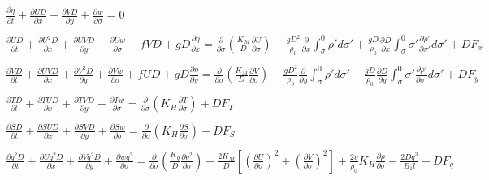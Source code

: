 \documentclass[oribibl]{llncs}
\begin{document}
\begin{eqnarray}
&&\frac{\partial \eta}{\partial t} + \frac{\partial UD}{\partial x}+ \frac{\partial VD}{\partial y}+ \frac{\partial w}{\partial \sigma}=0  \label{eq:final1}\\ 
\nonumber \\ 
&&\frac{\partial UD}{\partial t}  +\frac{\partial U^2D}{\partial x} +\frac{\partial UVD}{\partial y}+ \frac{\partial Uw}{\partial \sigma}-fVD+gD\frac{\partial \eta}{\partial x} = \frac{\partial}{\partial \sigma}\left( \frac{K_M}{D}\frac{\partial U}{\partial \sigma} \right) - \frac{gD^2}{\rho_0} \frac{\partial}{\partial x} \int_\sigma^0 \rho' d \sigma' + \frac{gD}{\rho_0}\frac{\partial D}{\partial x} \int_\sigma^0 \sigma' \frac{\partial \rho'}{\partial \sigma'} d \sigma' + DF_x  \label{eq:final2}\nonumber \\  
\\ 
&&\frac{\partial VD}{\partial t}  +\frac{\partial UVD}{\partial x} +\frac{\partial V^2D}{\partial y} + \frac{\partial Vw}{\partial \sigma} +fUD+gD\frac{\partial \eta}{\partial y} = \frac{\partial}{\partial \sigma}\left( \frac{K_M}{D}\frac{\partial V}{\partial \sigma} \right) - \frac{gD^2}{\rho_0} \frac{\partial}{\partial y} \int_\sigma^0 \rho' d \sigma' + \frac{gD}{\rho_0}\frac{\partial D}{\partial y} \int_\sigma^0 \sigma' \frac{\partial \rho'}{\partial \sigma'} d \sigma' + DF_y  \label{eq:final3}\nonumber \\  
\\  
&&\frac{\partial TD}{\partial t}+\frac{\partial TUD}{\partial x}+\frac{\partial TVD}{\partial y}+\frac{\partial Tw}{\partial \sigma} = \frac{\partial}{\partial \sigma}  \left ( K_H \frac{\partial T}{\partial \sigma} \right) +D F_T  \label{eq:final4}\\ 
\nonumber \\ 
&&\frac{\partial SD}{\partial t}+\frac{\partial SUD}{\partial x}+\frac{\partial SVD}{\partial y}+\frac{\partial Sw}{\partial \sigma} = \frac{\partial}{\partial \sigma}  \left ( K_H \frac{\partial S}{\partial \sigma} \right) +D F_S \label{eq:final5} \\ 
\nonumber \\ 
&&\frac{\partial q^2D}{\partial t} + \frac{\partial Uq^2D}{\partial x} +\frac{\partial Vq^2D}{\partial y} + \frac{\partial wq^2}{\partial \sigma}  = \frac{\partial}{\partial \sigma} \left( \frac{K_q}{D}  \frac{\partial q^2}{\partial \sigma} \right)+\frac{2K_M}{D}\left[ \left( \frac{\partial U}{\partial \sigma}\right)^2 + \left( \frac{\partial V}{\partial \sigma}\right)^2 \right] + \frac{2g}{\rho_0}K_H\frac{\partial \rho}{\partial \sigma} - \frac{2D q^3}{B_1 l} + D F_q  \label{eq:final6}\nonumber \\  

\end{eqnarray}
\end{document}
